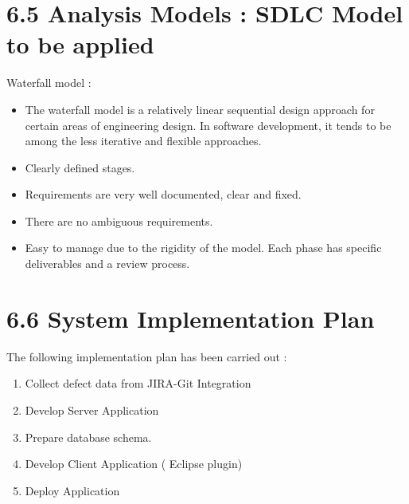 \documentclass[oneside,a4paper,12pt]{book}
\begin{document}
\section*{6.5 Analysis Models : SDLC Model to be applied}
\begin{justify}
Waterfall model :
\end{justify}\par

\setlength{\parskip}{0.0pt}
\begin{itemize}
	\item The waterfall model is a relatively linear sequential design approach for certain areas of engineering design. In software development, it tends to be among the less iterative and flexible approaches.\par

	\item Clearly defined stages.\par

	\item Requirements are very well documented, clear and fixed.\par

	\item There are no ambiguous requirements.\par

\setlength{\parskip}{9.96pt}
	\item Easy to manage due to the rigidity of the model. Each phase has specific deliverables and a review process.\par


\end{itemize}\section*{6.6 System Implementation Plan}
The following implementation plan has been carried out :\par

\setlength{\parskip}{0.0pt}
\begin{enumerate}
	\item Collect defect data from JIRA-Git Integration\par

	\item Develop Server Application\par

	\item Prepare database schema.\par

	\item Develop Client Application ( Eclipse plugin)\par

	\item Deploy Application
\end{enumerate}\par
\end{document}
